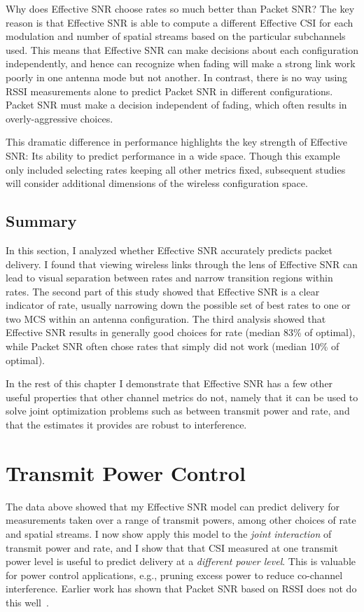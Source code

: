 Why does Effective SNR choose rates so much better than Packet SNR? The key reason is that Effective SNR is able to compute a different Effective CSI for each modulation and number of spatial streams based on the particular subchannels used. This means that Effective SNR can make decisions about each configuration independently, and hence can recognize when fading will make a strong link work poorly in one antenna mode but not another. In contrast, there is no way using RSSI measurements alone to predict Packet SNR in different configurations. Packet SNR must make a decision independent of fading, which often results in overly-aggressive choices.

This dramatic difference in performance highlights the key strength of Effective SNR: Its ability to predict performance in a wide space. Though this example only included selecting rates keeping all other metrics fixed, subsequent studies will consider additional dimensions of the wireless configuration space.

\subsection{Summary}
In this section, I analyzed whether Effective SNR accurately predicts packet delivery. I found that viewing wireless links through the lens of Effective SNR can lead to visual separation between rates and narrow transition regions within rates. The second part of this study showed that Effective SNR is a clear indicator of rate, usually narrowing down the possible set of best rates to one or two MCS within an antenna configuration. The third analysis showed that Effective SNR results in generally good choices for rate (median 83\% of optimal), while Packet SNR often chose rates that simply did not work (median 10\% of optimal).

In the rest of this chapter I demonstrate that Effective SNR has a few other useful properties that other channel metrics do not, namely that it can be used to solve joint optimization problems such as between transmit power and rate, and that the estimates it provides are robust to interference.

\section{Transmit Power Control}
\label{sec:tx_power_trim}
The data above showed that my Effective SNR model can predict delivery for measurements taken over a range of transmit powers, among other choices of rate and spatial streams. I now show apply this model to the \emph{joint interaction} of transmit power and rate, and I show that that CSI measured at one transmit power level is useful to predict delivery at a \emph{different power level}. This is valuable for power control applications, e.g., pruning excess power to reduce co-channel interference. Earlier work has shown that Packet SNR based on RSSI does not do this well~\cite{Monks_PowerMAC,Ramachandran_Symphony,Son_PowerStudy}. 

